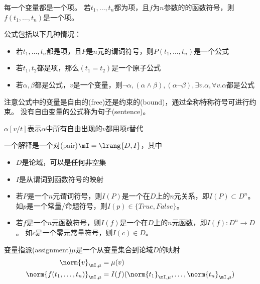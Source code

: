 \begin{definition}[项(term)]
每一个变量都是一个项。
若$t_1,\ldots,t_n$都为项，且$f$为$n$参数的的函数符号，则$f(t_1,\ldots,t_n)$是一个项。
\end{definition}
\begin{definition}[公式(formular)]
公式包括以下几种情况：
\begin{itemize}
\item 若$t_1,\ldots,t_n$都是项，且$P$是$n$元的谓词符号，则$P(t_1,\ldots,t_n)$是一个公式
\item 若$t_1,t_2$都是项，那么$(t_1=t_2)$是一个原子公式
\item 若$\alpha,\beta$都是公式，$v$是一个变量，则$\lnot\alpha,(\alpha\land\beta),(\alpha\lnot\beta),\exists v.\alpha,\forall v.\alpha$都是公式
\end{itemize}
注意公式中的变量是自由的(free)还是约束的(bound)，通过全称特称符号可进行约束。
没有自由变量的公式称为句子(sentence)。
\end{definition}
\begin{definition}[替换]
$\alpha[v/t]$表示$\alpha$中所有自由出现的$v$都用项$t$替代
\end{definition}
\begin{definition}[解释(interpretation)]
一个解释是一个对(pair)$\mI=\lrang{D,I}$，其中
\begin{itemize}
	\item $D$是论域，可以是任何非空集
	\item $I$是从谓词到函数符号的映射
	\item 若$P$是一个$n$元谓词符号，则$I(P)$是一个在$D$上的$n$元关系，即$I(P)\subset D^n$。
	如$p$是一个常量/命题符号，则$I(p)\in\{True,False\}$。
	\item 若$f$是一个$n$元函数符号，则$I(f)$是一个在$D$上的$n$元函数，即$I(f):D^n\to D$。
	如$c$是一个零元常量符号，则$I(c)\in D$。
\end{itemize}
\end{definition}
\begin{definition}[赋值(denotation)]
变量指派(assignment)$\mu$是一个从变量集合到论域$D$的映射
\[\begin{aligned}
\norm{v}_{\mI,\mu}&=\mu(v)\\
\norm{f(t_1,\ldots,t_n)}_{\mI,\mu}&=I(f)(\norm{t_1}_{\mI,\mu},\ldots,\norm{t_n}_{\mI,\mu})
\end{aligned}\]
\end{definition}
